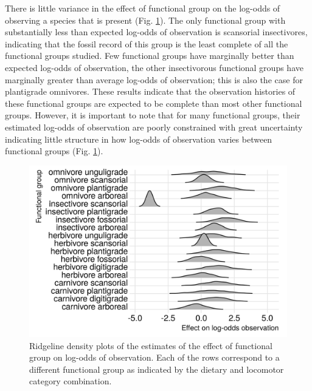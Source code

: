 \documentclass[12pt,letterpaper]{article}
\begin{document}
There is little variance in the effect of functional group on the log-odds of observing a species that is present (Fig. \ref{fig:fg_observe}). The only functional group with substantially less than expected log-odds of observation is scansorial insectivores, indicating that the fossil record of this group is the least complete of all the functional groups studied. Few functional groups have marginally better than expected log-odds of observation, the other insectivorous functional groups have marginally greater than average log-odds of observation; this is also the case for plantigrade omnivores. These results indicate that the observation histories of these functional groups are expected to be complete than most other functional groups. However, it is important to note that for many functional groups, their estimated log-odds of observation are poorly constrained with great uncertainty indicating little structure in how log-odds of observation varies between functional groups (Fig. \ref{fig:fg_observe}).
\begin{figure}[ht]
  \includegraphics[width=\textwidth,height=0.4\textheight,keepaspectratio=true]{figure/ecotype_observation}
  \caption{Ridgeline density plots of the estimates of the effect of functional group on log-odds of observation. Each of the rows correspond to a different functional group as indicated by the dietary and locomotor category combination.}
  \label{fig:fg_observe}
\end{figure}
\end{document}
